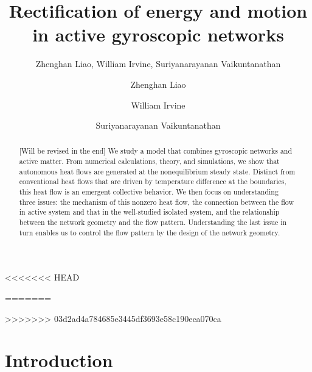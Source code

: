 \documentclass[
 preprint,
 preprintnumbers,
 amsmath,amssymb,
 aps,
 pre,
 longbibliography,
 superscriptaddress,
 10pt, twocolumn
]{revtex4-1}
\begin{document}
\newcommand{\eqnname}{Eqn.}
\newcommand{\secname}{Sec.}


\title{Rectification of energy and motion in active gyroscopic networks}

<<<<<<< HEAD
\author{Zhenghan Liao, William Irvine, Suriyanarayanan Vaikuntanathan}
=======

\author{Zhenghan Liao}
\author{William Irvine}
\author{Suriyanarayanan Vaikuntanathan}
>>>>>>> 03d2ad4a784685e3445df3693e58c190eca070ca


\begin{abstract}
[Will be revised in the end] We study a model that combines gyroscopic networks and active matter. From numerical calculations, theory, and simulations, we show that autonomous heat flows are generated at the nonequilibrium steady state. Distinct from conventional heat flows that are driven by temperature difference at the boundaries, this heat flow is an emergent collective behavior.
We then focus on understanding three issues: the mechanism of this nonzero heat flow, the connection between the flow in active system and that in the well-studied isolated system, and the relationship between the network geometry and the flow pattern.
Understanding the last issue in turn enables us to control the flow pattern by the design of the network geometry.
\end{abstract}

\maketitle

\section{Introduction} \label{sec:intro}

\end{document}
